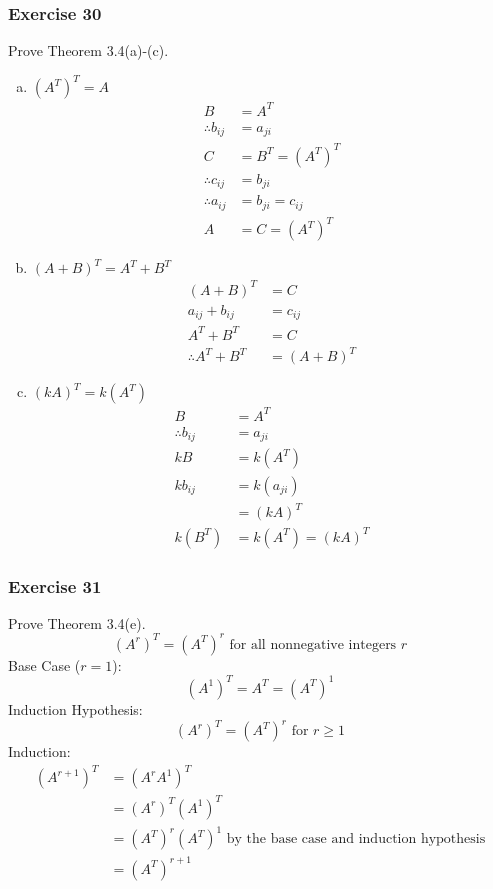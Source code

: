 \documentclass[letterpaper, 12pt]{math}
\begin{document}
\subsubsection*{Exercise 30}
Prove Theorem 3.4(a)-(c).
\begin{enumerate}[(a)]
  \item \( (A^T)^T = A \)
  \begin{align*}
    B &= A^T \\
    \therefore b_{ij} &= a_{ji} \\
    C &= B^T = (A^T)^T \\
    \therefore c_{ij} &= b_{ji} \\
    \therefore a_{ij} &= b_{ji} = c_{ij} \\
    A &= C = (A^T)^T
  \end{align*}
  \item \( (A+B)^T = A^T+B^T \)
  \begin{align*}
    (A+B)^T &= C \\
    a_{ij}+b_{ij} &= c_{ij} \\
    A^T+B^T &= C \\
    \therefore A^T+B^T &= (A+B)^T
  \end{align*}
  \item \( (kA)^T = k(A^T) \)
  \begin{align*}
    B &= A^T \\
    \therefore b_{ij} &= a_{ji} \\
    kB &= k(A^T) \\
    kb_{ij} &= k(a_{ji}) \\
    &= (kA)^T \\
    k(B^T) &= k(A^T) = (kA)^T
  \end{align*}
\end{enumerate}

\subsubsection*{Exercise 31}
Prove Theorem 3.4(e).
\[ (A^r)^T = (A^T)^r \text{ for all nonnegative integers } r \]
Base Case (\( r = 1 \)):
\[ (A^1)^T = A^T = (A^T)^1 \]
Induction Hypothesis:
\[ (A^r)^T = (A^T)^r \text{ for } r\ge1 \]
Induction:
\begin{align*}
  (A^{r+1})^T &= (A^rA^1)^T \\
  &= (A^r)^T(A^1)^T \\
  &= (A^T)^r(A^T)^1 \text{ by the base case and induction hypothesis} \\
  &= (A^T)^{r+1}
\end{align*}
\end{document}
